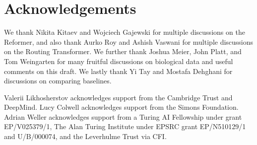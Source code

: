\section{Acknowledgements}
We thank Nikita Kitaev and Wojciech Gajewski for multiple discussions on the Reformer, and also thank Aurko Roy and Ashish Vaswani for multiple discussions on the Routing Transformer. We further thank Joshua Meier, John Platt, and Tom Weingarten for many fruitful discussions on biological data and useful comments on this draft. We lastly thank Yi Tay and Mostafa Dehghani for discussions on comparing baselines.

Valerii Likhosherstov acknowledges support from the Cambridge Trust and DeepMind. Lucy Colwell acknowledges support from the Simons Foundation. Adrian Weller acknowledges support from %
a Turing AI Fellowship under grant EP/V025379/1, The Alan Turing Institute under EPSRC grant EP/N510129/1 and U/B/000074, and the Leverhulme Trust via CFI. 